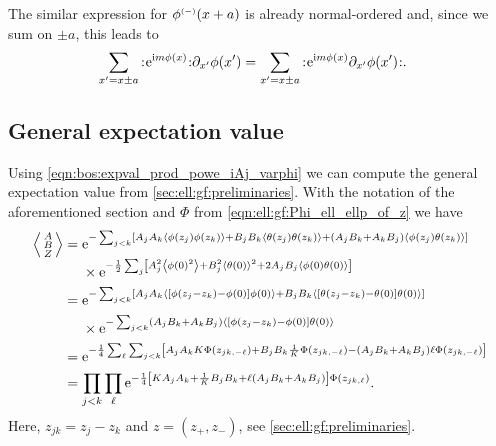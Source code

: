 The similar expression for $\phi\eminus(x+a)$ is already normal-ordered and, since we sum on $\pm a$, this leads to
\begin{align*}
\sum_{x'=x\pm a} \normord{\powe{\i m\phi(x)}} \partial_{x'} \phi(x') &= \sum_{x'=x\pm a} \normord{\powe{\i m\phi(x)}\partial_{x'}\phi(x')}.
\end{align*}
\subsection{General expectation value}\label{sec:app:expval_ABZ_general}
Using \autoref{eqn:bos:expval_prod_powe_iAj_varphi} we can compute the general expectation value from \autoref{sec:ell:gf:preliminaries}.
With the notation of the aforementioned section and $\Phi$ from \autoref{eqn:ell:gf:Phi_ell_ellp_of_z} we have
\begin{align*}
\bra*{\abx{A}{B}{Z}} &= \bsplit{&\powe{-\sum_{j<k} \klb*{A_jA_k \bra*{\phi(z_j)\phi(z_k)} + B_jB_k \bra*{\theta(z_j)\theta(z_k)} + \kla*{A_jB_k + A_kB_j} \bra*{\phi(z_j)\theta(z_k)}} }\\
&\times \powe{-\frac{1}{2} \sum_j \klb*{A_j^2 \bra*{\phi(0)^2} + B_j^2 \bra*{\theta(0)}^2 + 2A_jB_j \bra*{\phi(0)\theta(0)}}}}\\
&= \bsplit{&\powe{-\sum_{j<k} \klb*{A_jA_k \bra*{\klb*{\phi(z_j-z_k) - \phi(0)}\phi(0)} +  B_jB_k \bra*{\klb*{\theta(z_j-z_k) - \theta(0)}\theta(0)}}}\\
&\times \powe{-\sum_{j<k} \kla*{A_jB_k + A_kB_j} \bra*{\klb*{\phi(z_j-z_k) - \phi(0)}\theta(0)}}}\\
&= \powe{-\frac{1}{4} \sum_\ell \sum_{j<k} \klb*{A_jA_k K\Phi(z_{jk,-\ell}) +  B_jB_k \frac{1}{K} \Phi(z_{jk,-\ell}) - \kla*{A_jB_k + A_kB_j} \ell \Phi(z_{jk,-\ell})}}\\
&= \prod_{j<k} \prod_\ell \powe{-\frac{1}{4} \klb*{KA_jA_k + \frac{1}{K} B_jB_k + \ell \kla*{A_jB_k + A_kB_j}} \Phi(z_{jk,\ell})}.
\end{align*}
Here, $z_{jk} = z_j - z_k$ and $z=(z_+,z_-)$, see \autoref{sec:ell:gf:preliminaries}.
